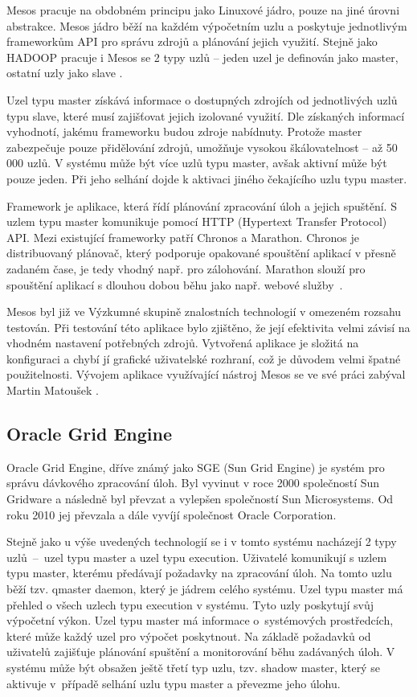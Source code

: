 Mesos pracuje na obdobném principu jako Linuxové jádro, pouze na jiné úrovni abstrakce. Mesos jádro běží na každém výpočetním uzlu a poskytuje jednotlivým frameworkům API pro správu zdrojů a plánování jejich využití. Stejně jako HADOOP pracuje i Mesos se 2 typy uzlů -- jeden uzel je definován jako master, ostatní uzly jako slave \cite{existTools_Mesis_whatIsMesis}.

Uzel typu master získává informace o dostupných zdrojích od jednotlivých uzlů typu slave, které musí zajišťovat jejich izolované využití. Dle získaných informací vyhodnotí, jakému frameworku budou zdroje nabídnuty. Protože master zabezpečuje pouze přidělování zdrojů, umožňuje vysokou škálovatelnost -- až 50 000 uzlů. V systému může být více uzlů typu master, avšak aktivní může být pouze jeden. Při jeho selhání dojde k aktivaci jiného čekajícího uzlu typu master.

Framework je aplikace, která řídí plánování zpracování úloh a jejich spuštění. S uzlem typu master komunikuje pomocí HTTP (Hypertext Transfer Protocol) API. Mezi existující frameworky patří Chronos a Marathon. Chronos je distribuovaný plánovač, který podporuje opakované spouštění aplikací v přesně zadaném čase, je tedy vhodný např. pro zálohování. Marathon slouží pro spouštění aplikací s dlouhou dobou běhu jako např. webové služby~\cite{existTools_Mesis_howItWorks}.

Mesos byl již ve Výzkumné skupině znalostních technologií v omezeném rozsahu testován. Při testování této aplikace bylo zjištěno, že její efektivita velmi závisí na vhodném nastavení potřebných zdrojů. Vytvořená aplikace je složitá na konfiguraci a chybí jí grafické uživatelské rozhraní, což je důvodem velmi špatné použitelnosti. Vývojem aplikace využívající nástroj Mesos se ve své práci zabýval Martin Matoušek \cite{existTools_Mesis_frameworks}.

\subsection*{Oracle Grid Engine}

Oracle Grid Engine, dříve známý jako SGE (Sun Grid Engine) je systém pro správu dávkového zpracování úloh. Byl vyvinut v roce 2000 společností Sun Gridware a následně byl převzat a vylepšen společností Sun Microsystems. Od roku 2010 jej převzala a dále vyvíjí společnost Oracle Corporation.

Stejně jako u výše uvedených technologií se i v tomto systému nacházejí 2 typy uzlů~--~uzel typu master a uzel typu execution. Uživatelé komunikují s uzlem typu master, kterému předávají požadavky na zpracování úloh. Na tomto uzlu běží tzv. qmaster daemon, který je jádrem celého systému. Uzel typu master má přehled o všech uzlech typu execution v systému. Tyto uzly poskytují svůj výpočetní výkon. Uzel typu master má informace o~systémových prostředcích, které může každý uzel pro výpočet poskytnout. Na základě požadavků od uživatelů zajišťuje plánování spuštění a monitorování běhu zadávaných úloh. V systému může být obsažen ještě třetí typ uzlu, tzv. shadow master, který se aktivuje v~případě selhání uzlu typu master a převezme jeho úlohu.

